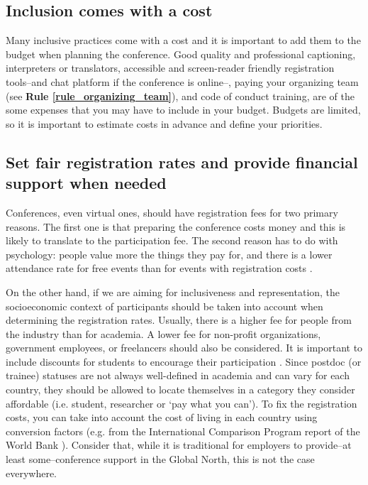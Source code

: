 \documentclass[10pt,letterpaper]{article}
\begin{document}
\subsection*{Inclusion comes with a cost}

Many inclusive practices come with a cost and it is important to add them to the budget when planning the conference. 
Good quality and professional captioning, interpreters or translators, accessible and screen-reader friendly registration tools--and chat platform if the conference is online--, paying your organizing team (see \textbf{Rule \ref{rule_organizing_team}}), and code of conduct training, are of the some expenses that you may have to include in your budget. 
Budgets are limited, so it is important to estimate costs in advance and define your priorities.

\subsection*{Set fair registration rates and provide financial support when needed}

Conferences, even virtual ones, should have registration fees for two primary reasons. The first one is that preparing the conference costs money and this is likely to translate to the participation fee. The second reason has to do with psychology: people value more the things they pay for, and there is a lower attendance rate for free events than for events with registration costs \cite{eventbrite_ultimate_2017}. 

On the other hand, if we are aiming for inclusiveness and representation, the socioeconomic context of participants should be taken into account when determining the registration rates. Usually, there is a higher fee for people from the industry than for academia. A lower fee for non-profit organizations, government employees, or freelancers should also be considered. It is important to include discounts for students to encourage their participation \cite{sarabipourChangingScientificMeetings2021, andalibPostdocQueueLabour2018, kaplanPostdocNot2012}. Since postdoc (or trainee) statuses are not always well-defined in academia and can vary for each country, they should be allowed to locate themselves in a category they consider affordable (i.e. student, researcher or `pay what you can'). To fix the registration costs, you can take into account the cost of living in each country using conversion factors (e.g. from the International Comparison Program report of the World Bank \cite{arendDisparityConferenceRegistration2019}). Consider that, while it is traditional for employers to provide--at least some--conference support in the Global North, this is not the case everywhere. 
\end{document}
